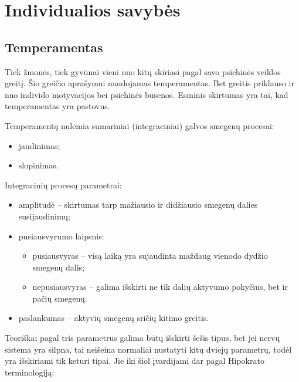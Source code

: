 \chapter{Individualios savybės}

\label{tema:individualios_savybes}

\section{Temperamentas}

\label{tema:temperamentas}

Tiek žmonės, tiek gyvūnai vieni nuo kitų skiriasi pagal savo psichinės 
veiklos greitį. Šio greičio aprašymui naudojamas \gls{temperamentas}. 
Bet greitis priklauso ir nuo individo motyvacijos bei psichinės būsenos. 
Esminis skirtumas yra tai, kad temperamentas yra pastovus.

Temperamentą nulemia %
sumariniai (integraciniai) galvos smegenų procesai:

\begin{itemize}
  \item jaudinimas; 
  \item slopinimas.
\end{itemize}

Integracinių procesų parametrai:

\begin{itemize}
  \item amplitudė – skirtumas tarp mažiausio ir didžiausio smegenų dalies
    susijaudinimų;
  \item pusiausvyrumo laipsnis:
    \begin{itemize}
      \item pusiausvyras – visą laiką yra sujaudinta maždaug vienodo
        dydžio smegenų dalis;
      \item nepusiausvyras – galima išskirti ne tik dalių aktyvumo pokyčius,
        bet ir pačių smegenų.
    \end{itemize}
  \item paslankumas – aktyvių smegenų sričių kitimo greitis.
\end{itemize}

Teoriškai pagal tris parametrus galima būtų išskirti šešis tipus, bet
jei nervų sistema yra silpna, tai neišeina normaliai nustatyti kitų dviejų
parametrų, todėl yra išskiriami tik keturi tipai. Jie iki šiol įvardijami
dar pagal Hipokrato terminologiją:

